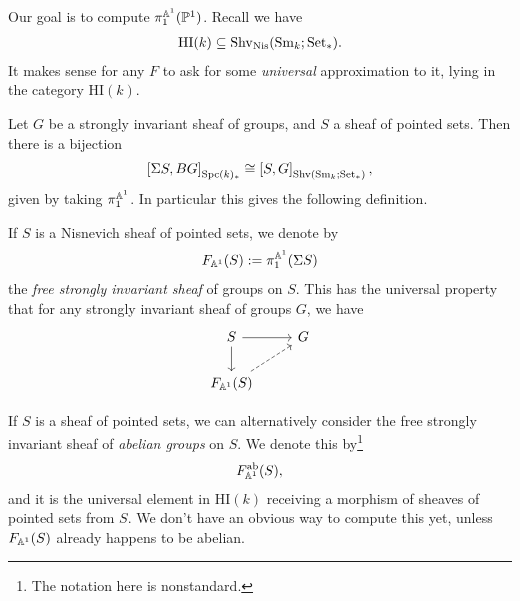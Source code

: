 \documentclass[11pt,openany]{book}
\providecommand{\HI}{\mathrm{HI}}
\begin{document}
Our goal is to compute $\pi_1^{\mathbb{A}^1}(\mathbb{P}^1)$. Recall we have
\begin{align*}
    \HI(k) \subseteq \Shv_\Nis(\Sm_k;\Set_\ast).
\end{align*}
It makes sense for any $F$ to ask for some \textit{universal} approximation to it, lying in the category $\HI(k)$.

Let $G$ be a strongly invariant sheaf of groups, and $S$ a sheaf of pointed sets. Then there is a bijection
\begin{align*}
    \left[ \Sigma S, BG \right]_{\mathrm{Spc}(k)_\ast} \cong \left[ S, G \right]_{\mathrm{Shv}(\mathrm{Sm}_k;\mathrm{Set}_\ast)},
\end{align*}
given by taking $\pi_1^{\mathbb{A}^1}$. In particular this gives the following definition.

\begin{definition} \cite[7.23]{Morel} If $S$ is a Nisnevich sheaf of pointed sets, we denote by
\begin{align*}
    F_{\mathbb{A}^1}(S) := \pi_1^{\mathbb{A}^1}(\Sigma S)
\end{align*}
the \textit{free strongly invariant sheaf} of groups on $S$. This has the universal property that for any strongly invariant sheaf of groups $G$, we have
\[\begin{tikzcd}
    S\rar\dar & G\\
    F_{\A^1}(S)\ar[ur,dashed] & 
\end{tikzcd} \]
\end{definition}

\begin{definition} If $S$ is a sheaf of pointed sets, we can alternatively consider the free strongly invariant sheaf of \textit{abelian groups} on $S$. We denote this by\footnote{%
The notation here is nonstandard.}
\begin{align*}
    F_{\mathbb{A}^1}^{\mathrm{ab}}(S),
\end{align*}
and it is the universal element in $\HI(k)$ receiving a morphism of sheaves of pointed sets from $S$. We don't have an obvious way to compute this yet, unless $F_{\mathbb{A}^1}(S)$ already happens to be abelian.
\end{definition}
\end{document}
